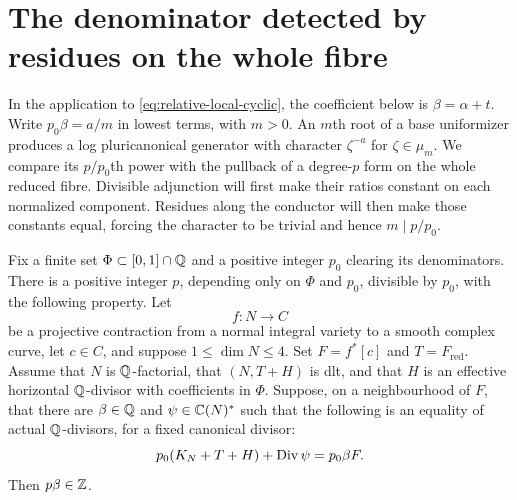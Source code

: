 \section{The denominator detected by residues on the whole fibre}
\label{sec:residue}

In the application to \eqref{eq:relative-local-cyclic}, the coefficient
below is $\beta=\alpha+t$.  Write $p_0\beta=a/m$ in lowest terms, with
$m>0$.  An $m$th root of a base uniformizer produces a log
pluricanonical generator with character $\zeta^{-a}$ for
$\zeta\in\mu_m$.  We compare its
$p/p_0$th power with the pullback of a degree-$p$ form on the whole
reduced fibre.  Divisible adjunction will first make their ratios
constant on each normalized component.  Residues along the conductor
will then make those constants equal, forcing the character to be
trivial and hence $m\mid p/p_0$.

\begin{lemma}
\label{lem:slc-residue-test}
Fix a finite set $\Phi\subset[0,1]\cap\mathbb Q$ and a positive integer
$p_0$ clearing its denominators.  There is a positive integer $p$,
depending only on $\Phi$ and $p_0$, divisible by $p_0$, with the following
property.  Let
\[
 f\colon N\longrightarrow C
\]
be a projective contraction from a normal integral variety to a smooth
complex curve, let $c\in C$, and suppose $1\leq\dim N\leq4$.  Set
$F=f^*[c]$ and $T=F_{\mathrm{red}}$.  Assume that $N$ is
$\mathbb Q$-factorial, that $(N,T+H)$ is dlt, and that $H$ is an effective
horizontal $\mathbb Q$-divisor with coefficients in $\Phi$.  Suppose, on a
neighbourhood of $F$, that there are $\beta\in\mathbb Q$ and
$\psi\in\mathbb C(N)^*$ such that the following is an equality of actual
$\mathbb Q$-divisors, for a fixed canonical divisor:
\begin{equation}
 \label{eq:slc-local-relation}
 p_0(K_N+T+H)+\operatorname{Div}\psi
       =p_0\beta F.
\end{equation}
Then $p\beta\in\mathbb Z$.
\end{lemma}

